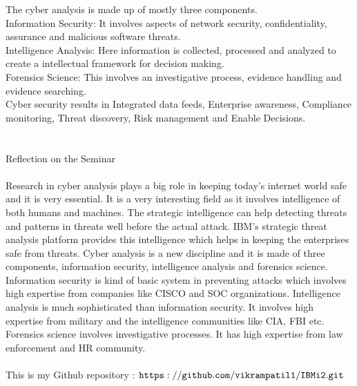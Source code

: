 \documentclass{article}
\begin{document}
The cyber analysis is made up of mostly three components.\\
Information Security: It involves aspects of network security, confidentiality, assurance and malicious software threats.\\
Intelligence Analysis: Here information is collected, processed and analyzed to create a intellectual framework for decision making.\\
Forensics Science: This involves an investigative process, evidence handling and evidence searching.\\
Cyber security results in Integrated data feeds, Enterprise awareness, Compliance monitoring, Threat discovery, Risk management and Enable Decisions.\\\\\\
Reflection on the Seminar\\\\
Research in cyber analysis plays a big role in keeping today’s internet world safe and it is very essential. It is a very interesting field as it involves intelligence of both humans and machines. The strategic intelligence can help detecting threats and patterns in threats well before the actual attack. 
IBM’s strategic threat analysis platform provides this intelligence which helps in keeping the enterprises safe from threats. Cyber analysis is a new discipline and it is made of three components, information security, intelligence analysis and forensics science. Information security is kind of basic system in preventing attacks which involves high expertise from companies like CISCO and SOC organizations.
Intelligence analysis is much sophisticated than information security. It involves high expertise from military and the intelligence communities like CIA, FBI etc. Forensics science involves investigative processes. It has high expertise from law enforcement and HR community.\\\\

This is my Github repository : {$\tt https://github.com/vikrampatil1/IBMi2.git$}
\end{document}
